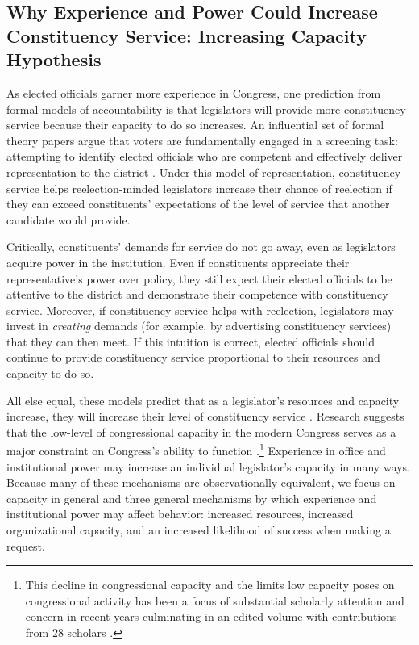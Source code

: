 \documentclass[12pt]{article}
\begin{document}
\subsection{Why Experience and Power Could Increase Constituency Service: Increasing Capacity Hypothesis}



As elected officials garner more experience in Congress, one prediction from formal models of accountability is that legislators will provide more constituency service because their capacity to do so increases. An influential set of formal theory papers argue that voters are fundamentally engaged in a screening task: attempting to identify elected officials who are competent and effectively deliver representation to the district \citep{AshworthBuenodeMesquita2006, gordon2009advantages}. Under this model of representation, constituency service helps reelection-minded legislators increase their chance of reelection if they can exceed constituents' expectations of the level of service that another candidate would provide.  

Critically, constituents' demands for service do not go away, even as legislators acquire power in the institution. Even if constituents appreciate their representative's power over policy, they still expect their elected officials to be attentive to the district and demonstrate their competence with constituency service. Moreover, if constituency service helps with reelection, legislators may invest in \textit{creating} demands (for example, by advertising constituency services) that they can then meet. If this intuition is correct, elected officials should continue to provide constituency service proportional to their resources and capacity to do so. 

All else equal, these models predict that as a legislator's resources and capacity increase, they will increase their level of constituency service \cite[Proposition 1]{AshworthBuenodeMesquita2006}. Research suggests that the low-level of congressional capacity in the modern Congress serves as a major constraint on Congress's ability to function \citep{LaPira2020}.\footnote{This decline in congressional capacity and the limits low capacity poses on congressional activity has been a focus of substantial scholarly attention and concern in recent years culminating in an edited volume with contributions from 28 scholars \citep{LaPira2020}.} 
Experience in office and institutional power may increase an individual legislator's capacity in many ways. Because many of these mechanisms are observationally equivalent, we focus on capacity in general and three general mechanisms by which experience and institutional power may affect behavior: increased resources, increased organizational capacity, and an increased likelihood of success when making a request. 
\end{document}
